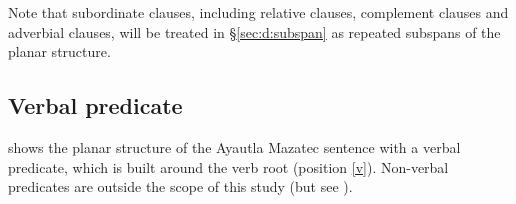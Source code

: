 \documentclass[output=paper]{langscibook}
\begin{document}
Note that subordinate clauses, including relative clauses, complement clauses and adverbial clauses, will be treated in \S\ref{sec:d:subspan} as repeated subspans of the planar structure.

\subsection{Verbal predicate}\label{sec-ayaplanar:vpred}
 shows the planar structure of the Ayautla Mazatec sentence with a verbal predicate, which is built around the verb root (position \ref{v}). Non-verbal predicates are outside the scope of this study (but see \citealt[55--57, 252]{nakamoto20}).
\end{document}
